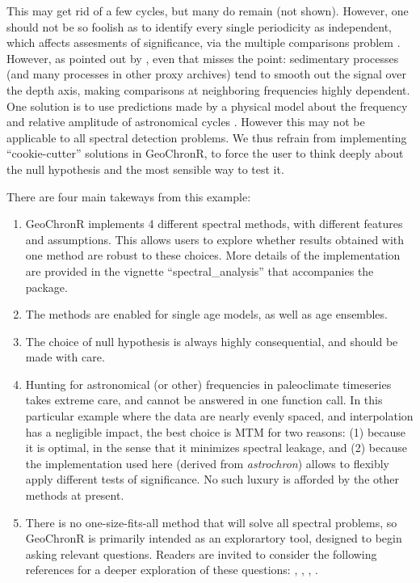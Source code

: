 \documentclass[gc, manuscript]{copernicus}
\begin{document}
This may get rid of a few cycles, but many do remain (not shown). However, one should not be so foolish as to identify every single periodicity as independent, which affects assesments of significance, via the multiple comparisons problem \citep{Vaughan_PP2011}. However, as pointed out by \citet{Meyers_2012}, even that misses the point: sedimentary processes (and many processes in other proxy archives) tend to smooth out the signal over the depth axis, making comparisons at neighboring frequencies highly dependent. One solution is to use predictions made by a physical model about the frequency and relative amplitude of astronomical cycles \citep{MeyersSageman_2007}. However this may not be applicable to all spectral detection problems. We thus refrain from implementing ``cookie-cutter'' solutions in GeoChronR, to force the user to think deeply about the null hypothesis and the most sensible way to test it.

There are four main takeways from this example:

\begin{enumerate}
\def\labelenumi{\arabic{enumi}.}
\item
  GeoChronR implements 4 different spectral methods, with different features and assumptions. This allows users to explore whether results obtained with one method are robust to these choices. More details of the implementation are provided in the vignette ``spectral\_analysis'' that accompanies the package.
\item
  The methods are enabled for single age models, as well as age ensembles.
\item
  The choice of null hypothesis is always highly consequential, and should be made with care.
\item
  Hunting for astronomical (or other) frequencies in paleoclimate timeseries takes extreme care, and cannot be answered in one function call. In this particular example where the data are nearly evenly spaced, and interpolation has a negligible impact, the best choice is MTM for two reasons: (1) because it is optimal, in the sense that it minimizes spectral leakage, and (2) because the implementation used here (derived from \emph{astrochron}) allows to flexibly apply different tests of significance. No such luxury is afforded by the other methods at present.
\item
  There is no one-size-fits-all method that will solve all spectral problems, so GeoChronR is primarily intended as an explorartory tool, designed to begin asking relevant questions. Readers are invited to consider the following references for a deeper exploration of these questions: \citet{Vaughan_PP2011}, \citet{Meyers_2012}, \citet{Meyers_2015}, \citet{MeyersMalinverno2018}.
\end{enumerate}
\end{document}
